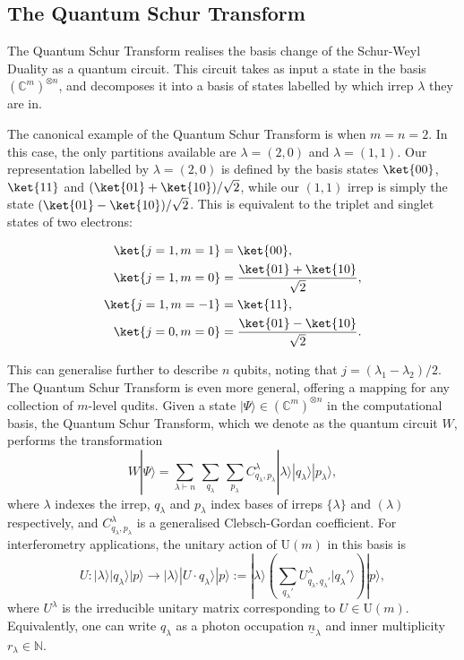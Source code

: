 \subsection{The Quantum Schur Transform}

The Quantum Schur Transform realises the basis change of the Schur-Weyl Duality as a quantum circuit. This circuit takes as input a state in the basis $(\mathbb{C}^m)^{\otimes n}$, and decomposes it into a basis of states labelled by which irrep $\lambda$ they are in.

The canonical example of the Quantum Schur Transform is when $m=n=2$. In this case, the only partitions available are $\lambda=(2,0)$ and $\lambda=(1,1)$. Our representation labelled by $\lambda=(2,0)$ is defined by the basis states $\ket{00}$, $\ket{11}$ and $(\ket{01}+\ket{10})/\sqrt{2}$, while our $(1,1)$ irrep is simply the state $(\ket{01}-\ket{10})/\sqrt{2}$. This is equivalent to the triplet and singlet states of two electrons:

\begin{align}
\ket{j=1,m=1} &= \ket{00},\\
\ket{j=1,m=0} &= \frac{\ket{01}+\ket{10}}{\sqrt{2}},\\
\ket{j=1,m=-1} &= \ket{11},\\
\ket{j=0,m=0} &= \frac{\ket{01}-\ket{10}}{\sqrt{2}}.
\end{align}

This can generalise further to describe $n$ qubits, noting that $j=(\lambda_1-\lambda_2)/2$. The Quantum Schur Transform is even more general, offering a mapping for any collection of $m$-level qudits. Given a state $|\Psi\rangle \in (\mathbb{C}^m)^{\otimes n}$ in the computational basis, the Quantum Schur Transform, which we denote as the quantum circuit $W$, performs the transformation
\begin{equation}
W|\Psi\rangle
 = \sum_{\lambda \vdash n} \, \sum_{q_{\lambda}} \, \sum_{p_\lambda}C^\lambda_{q_\lambda,p_\lambda}|\lambda\rangle|q_\lambda\rangle|p_\lambda\rangle , 
\end{equation}
where $\lambda$ indexes the irrep, $q_\lambda$ and $p_\lambda$ index bases of irreps $\{\lambda\}$ and $(\lambda)$ respectively, and $C^\lambda_{q_\lambda,p_\lambda}$ is a generalised Clebsch-Gordan coefficient.
For interferometry applications, the unitary action of U$(m)$ in this basis is
\begin{equation}
U : |\lambda\rangle |q_\lambda\rangle |p\rangle \rightarrow |\lambda\rangle |U\cdot q_\lambda\rangle |p\rangle := |\lambda\rangle \left( \sum_{q_\lambda'} U^\lambda_{q_\lambda, q_\lambda'} |q_\lambda'\rangle \right) |p\rangle ,
\end{equation}
where $U^\lambda$ is the irreducible unitary matrix corresponding to $U \in \mathrm{U}(m)$. Equivalently, one can write $q_\lambda$ as a photon occupation $\underline{n}_\lambda$ and inner multiplicity $r_\lambda \in \mathbb{N}$.

